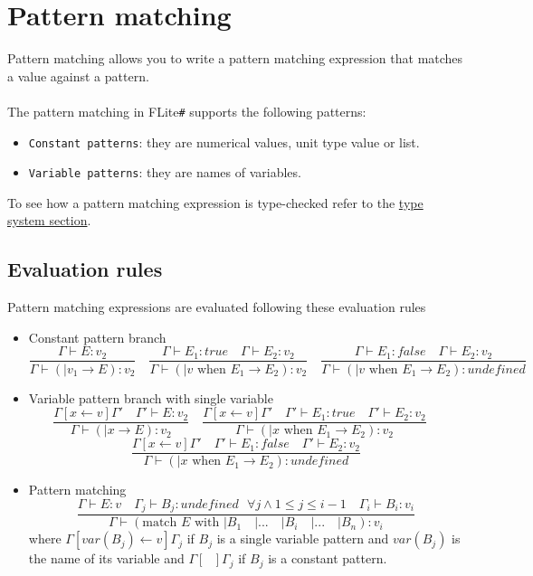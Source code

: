 \documentclass[]{article}
\begin{document}
	\section{Pattern matching}
	\label{sec:patternMatching}
		Pattern matching allows you to write a pattern matching expression that matches a value against a pattern.\\\\
		The pattern matching in FLite\verb|#| supports the following patterns:
		\begin{itemize}
			\item \verb|Constant patterns|: they are numerical values, unit type value or list.
			\item \verb|Variable patterns|: they are names of variables.
		\end{itemize}
		To see how a pattern matching expression is type-checked refer to the \hyperref[sec:typeSystem]{type system section}.
		
		\subsection{Evaluation rules}
			Pattern matching expressions are evaluated following these evaluation rules
			\begin{itemize}
				\item Constant pattern branch
				\[
				\frac{\Gamma \vdash E: v_2}{\Gamma \vdash (| v_1 \rightarrow E): v_2} \quad
				\frac{\Gamma \vdash E_1: true \quad \Gamma \vdash E_2: v_2}{\Gamma \vdash (| v \text{ when } E_1 \rightarrow E_2): v_2} \quad
				\frac{\Gamma \vdash E_1: false \quad \Gamma \vdash E_2: v_2}{\Gamma \vdash (| v \text{ when } E_1 \rightarrow E_2): undefined}
				\]
				\item Variable pattern branch with single variable
				\[
				\frac{\Gamma[x \leftarrow v]\Gamma' \quad\Gamma' \vdash E: v_2}{\Gamma \vdash (| x \rightarrow E): v_2} \quad
				\frac{\Gamma[x \leftarrow v]\Gamma' \quad\Gamma' \vdash E_1: true \quad \Gamma' \vdash E_2: v_2}{\Gamma \vdash (| x \text{ when } E_1 \rightarrow E_2): v_2} \quad
				\]
				\[
				\frac{\Gamma[x \leftarrow v]\Gamma' \quad\Gamma' \vdash E_1: false \quad \Gamma' \vdash E_2: v_2}{\Gamma \vdash (| x \text{ when } E_1 \rightarrow E_2): undefined}
				\]
				\item Pattern matching
				\[
				\frac{\Gamma \vdash E : v \quad \Gamma_j \vdash B_j : undefined \text{ } \forall j \land 1 \le j \le i-1 \quad \Gamma_i \vdash B_i : v_i}{\Gamma \vdash (\text{match } E \text{ with }| B_1 \quad| ...\quad | B_i\quad | ...\quad | B_n): v_i}
				\]
				where $\Gamma[var(B_j) \leftarrow v]\Gamma_j $ if $B_j$ is a single variable pattern and $var(B_j)$ is the name of its variable and $\Gamma[\text{ }]\Gamma_j$ if $B_j$ is a constant pattern.
			\end{itemize}
	
\end{document}
